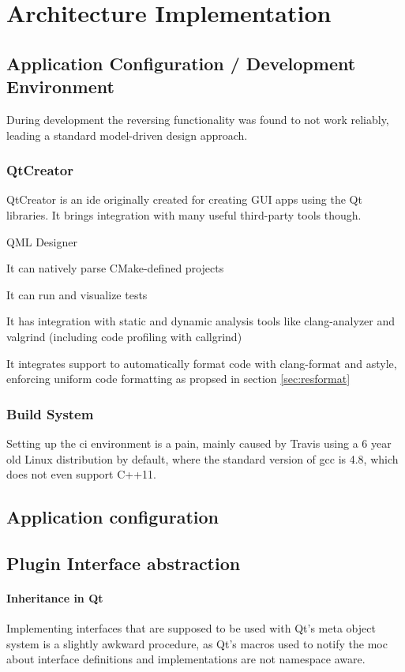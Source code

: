 \chapter{Architecture Implementation}
\section{Application Configuration / Development Environment}

During development the reversing functionality was found to not work reliably, leading a standard model-driven design approach.

\subsection{QtCreator}

QtCreator is an \gls{ide} originally created for creating GUI apps using the Qt libraries. It brings integration with many useful third-party tools though.

QML Designer

It can natively parse CMake-defined projects

It can run and visualize tests

It has integration with static and dynamic analysis tools like clang-analyzer and valgrind (including code profiling with callgrind)

It integrates support to automatically format code with clang-format and astyle, enforcing uniform code formatting as propsed in section \ref{sec:resformat}


\subsection{Build System}
Setting up the \gls{ci} environment is a pain, mainly caused by Travis using a 6 year old Linux distribution by default, where the standard version of gcc is 4.8, which does not even support C++11.



\section{Application configuration}

\section{Plugin Interface abstraction}
\subsubsection{Inheritance in Qt}
Implementing interfaces that are supposed to be used with Qt's meta object system is a slightly awkward procedure, as Qt's macros used to notify the moc about interface definitions and implementations are not namespace aware. 

